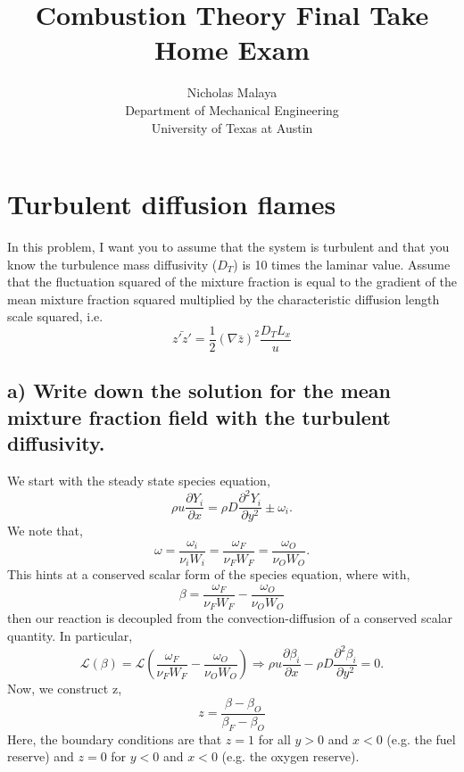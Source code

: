 \documentclass{article}
\title{Combustion Theory Final Take Home Exam}
\author{Nicholas Malaya\\ Department of Mechanical Engineering \\
University of Texas at Austin}
\date{}
\begin{document}
\maketitle
\newpage


\section*{Turbulent diffusion flames}

In this problem, I want you to assume that the system is turbulent and
that you know the turbulence mass diffusivity ($D_T$) is 10 times the
laminar value. Assume that the fluctuation squared of the mixture
fraction is equal to the gradient of the mean mixture fraction squared
multiplied by the characteristic diffusion length scale squared, i.e.
\begin{equation}
 \bar{z'z'} = \frac{1}{2} (\nabla \bar z)^2 \frac{D_T L_x}{u}
\end{equation}

\subsection*{a) Write down the solution for the mean mixture fraction field
  with the turbulent diffusivity.}

We start with the steady state species equation, 
\begin{equation}
 \rho u \frac{\partial Y_i}{\partial x} = \rho D \frac{\partial^2
  Y_i}{\partial y^2} \pm \omega_i. 
\end{equation}
We note that, 
\begin{equation}
 \omega = \frac{\omega_i}{\nu_i W_i} = \frac{\omega_F}{\nu_F W_F} =
  \frac{\omega_O}{\nu_O W_O}. 
\end{equation}
This hints at a conserved scalar form of the species equation, where
with, 
\begin{equation}
 \beta  = \frac{\omega_F}{\nu_F W_F} - \frac{\omega_O}{\nu_O W_O}
\end{equation}
then our reaction is decoupled from the convection-diffusion of a
conserved scalar quantity. In particular, 
\begin{equation}
 \mathcal{L}(\beta)  = \mathcal{L}\left(\frac{\omega_F}{\nu_F W_F} -
				   \frac{\omega_O}{\nu_O W_O} \right)
 \Rightarrow \rho u \frac{\partial \beta_i}{\partial x} - \rho D \frac{\partial^2
  \beta_i}{\partial y^2} = 0. 
\end{equation}
Now, we construct z, 
\begin{equation}
 z = \frac{\beta -\beta_{O}}{\beta_F - \beta_{O}}
\end{equation}
Here, the boundary conditions are that $z=1$ for all $y>0$ and $x<0$
(e.g. the fuel reserve) and $z=0$ for $y<0$ and $x<0$ (e.g. the oxygen
reserve). 
\end{document}
